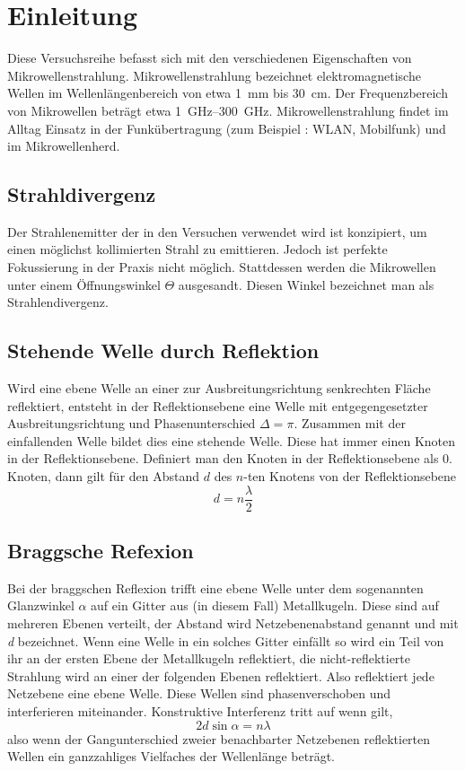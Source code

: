 \section{Einleitung}
Diese Versuchsreihe befasst sich mit den verschiedenen Eigenschaften von Mikrowellenstrahlung. Mikrowellenstrahlung bezeichnet elektromagnetische Wellen im Wellenlängenbereich von etwa \SI{1}{\milli\meter} bis \SI{30}{\centi\meter}. Der Frequenzbereich von Mikrowellen beträgt etwa \SIrange{1}{300}{\giga\hertz}. Mikrowellenstrahlung findet im Alltag Einsatz in der Funkübertragung (zum Beispiel : WLAN, Mobilfunk) und im Mikrowellenherd.
\subsection{Strahldivergenz}
Der Strahlenemitter der in den Versuchen verwendet wird ist konzipiert, um einen möglichst kollimierten Strahl zu emittieren. Jedoch ist perfekte Fokussierung in der Praxis nicht möglich. Stattdessen werden die Mikrowellen unter einem Öffnungswinkel $ \Theta $ ausgesandt. Diesen Winkel bezeichnet man als Strahlendivergenz.
\subsection{Stehende Welle durch Reflektion}
Wird eine ebene Welle an einer zur Ausbreitungsrichtung senkrechten Fläche reflektiert, entsteht in der Reflektionsebene eine Welle mit entgegengesetzter Ausbreitungsrichtung und Phasenunterschied $ \Delta = \pi $. Zusammen mit der einfallenden Welle bildet dies eine stehende Welle. Diese hat immer einen Knoten in der Reflektionsebene. Definiert man den Knoten in der Reflektionsebene als 0. Knoten, dann gilt für den Abstand $ d $ des $ n $-ten Knotens von der Reflektionsebene
\begin{equation}
	d = n \frac{\lambda}{2} \label{eq:stehend}
\end{equation}
\subsection{Braggsche Refexion}
Bei der braggschen Reflexion trifft eine ebene Welle unter dem sogenannten Glanzwinkel $ \alpha $ auf ein Gitter aus (in diesem Fall) Metallkugeln. Diese sind auf mehreren Ebenen verteilt, der Abstand wird Netzebenenabstand genannt und mit \textit{d} bezeichnet.
Wenn eine Welle in ein solches Gitter einfällt so wird ein Teil von ihr an der ersten Ebene der Metallkugeln reflektiert, die nicht-reflektierte Strahlung wird an einer der folgenden Ebenen reflektiert. Also reflektiert jede Netzebene eine ebene Welle. Diese Wellen sind phasenverschoben und interferieren miteinander. Konstruktive Interferenz tritt auf wenn gilt,
\begin{equation}
2\textit{d}\sin \alpha=n\lambda \label{eq:brag}
\end{equation}
also wenn der Gangunterschied zweier benachbarter Netzebenen reflektierten Wellen ein ganzzahliges Vielfaches der Wellenlänge beträgt. 
